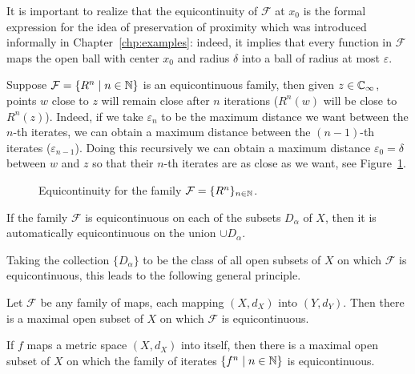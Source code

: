 It is important to realize that the equicontinuity of $\mathcal{F}$ at $x_0$ is
the formal expression for the idea of preservation of proximity which was
introduced informally in Chapter~\ref{chp:examples}: indeed, it implies that
every function in $\mathcal{F}$ maps the open ball with center $x_0$ and radius
$\delta$ into a ball of radius at most $\varepsilon$.

Suppose $\mathcal{F} = \{R^n \mid n \in \mathbb{N}\}$ is an equicontinuous family, then
given $z \in \mathbb{C}_\infty$, points $w$ close to $z$ will remain close after $n$
iterations ($R^n(w)$ will be close to $R^n(z)$). Indeed, if we take
$\varepsilon_n$ to be the maximum distance we want between the $n$-th iterates,
we can obtain a maximum distance between the $(n-1)$-th iterates
($\varepsilon_{n-1}$). Doing this recursively we can obtain a maximum distance
$\varepsilon_0 = \delta$ between $w$ and $z$ so that their $n$-th iterates are as
close as we want, see Figure~\ref{fig:equicontinuity_for_iterates}.
\begin{figure}
    \centering
    \resizebox{\textwidth}{!}{}
    \caption{Equicontinuity for the family $\mathcal{F} = \{R^n\}_{n \in \mathbb{N}}$.}
    \label{fig:equicontinuity_for_iterates}
\end{figure}

\begin{remark}
    If the family $\mathcal{F}$ is equicontinuous on each of the subsets
    $D_\alpha$ of $X$, then it is automatically equicontinuous on the union
    $\cup D_\alpha$.
\end{remark}

Taking the collection $\{D_\alpha\}$ to be the class of all open subsets of $X$
on which $\mathcal{F}$ is equicontinuous, this leads to the following general
principle.

\begin{theorem}
    Let $\mathcal{F}$ be any family of maps, each mapping $(X, d_X)$ into $(Y,
    d_Y)$. Then there is a maximal open subset of $X$ on which $\mathcal{F}$ is
    equicontinuous.
\end{theorem}

\begin{corollary}
    If $f$ maps a metric space $(X, d_X)$ into itself, then there is a maximal
    open subset of $X$ on which the family of iterates $\{f^n \mid n \in \mathbb{N}\}$
    is equicontinuous.
\end{corollary}

